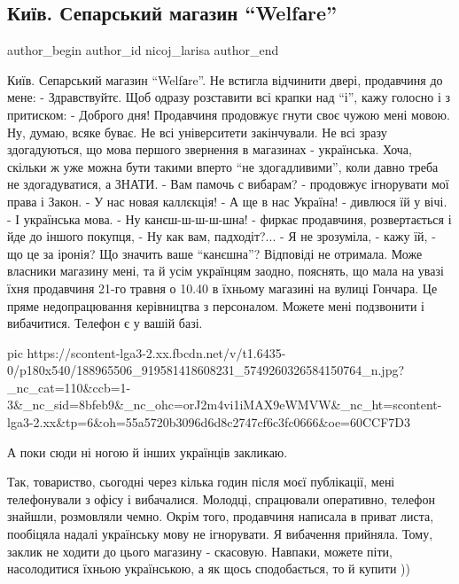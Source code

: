  
 
 
 
 
 
\subsection{Київ. Сепарський магазин \enquote{Welfаre}}
\label{sec:21_05_2021.fb.nicoj_larisa.2.kiev_magazin_welfare_mova}
\ifcmt
 author_begin
   author_id nicoj_larisa
 author_end
\fi

\obeycr
Київ. Сепарський магазин \enquote{Welfаre}.
Не встигла відчинити двері, продавчиня до мене:
- Здравствуйтє.
Щоб одразу розставити всі крапки над \enquote{і}, кажу голосно і з притиском:
- Доброго дня!
Продавчиня продовжує гнути своє чужою мені мовою. Ну, думаю, всяке буває. Не
всі університети закінчували. Не всі зразу здогадуються, що мова першого
звернення в магазинах - українська. Хоча, скільки ж уже можна бути такими
вперто \enquote{не здогадливими}, коли давно треба не здогадуватися, а ЗНАТИ.
- Вам памочь с вибарам? - продовжує ігнорувати мої права і Закон. - У нас новая каллєкція! 
- А ще в нас Україна! - дивлюся їй у вічі. - І українська мова.
- Ну канєш-ш-ш-ш-шна! - фиркає продавчиня, розвертається і йде до іншого покупця, - Ну как вам, падходіт?...
- Я не зрозуміла, - кажу їй, - що це за іронія? Що значить ваше \enquote{канєшна}? 
Відповіді не отримала. Може власники магазину мені, та й усім українцям заодно,
пояснять, що мала на увазі їхня продавчиня 21-го травня о 10.40 в їхньому
магазині на вулиці Гончара. Це пряме недопрацювання керівництва з персоналом.
Можете мені подзвонити і вибачитися. Телефон є у вашій базі. 
\restorecr

\ifcmt
  pic https://scontent-lga3-2.xx.fbcdn.net/v/t1.6435-0/p180x540/188965506_919581418608231_5749260326584150764_n.jpg?_nc_cat=110&ccb=1-3&_nc_sid=8bfeb9&_nc_ohc=orJ2m4vi1iMAX9eWMVW&_nc_ht=scontent-lga3-2.xx&tp=6&oh=55a5720b3096d6d8c2747cf6c3fc0666&oe=60CCF7D3
\fi

А поки сюди ні ногою й інших українців закликаю.

Так, товариство, сьогодні через кілька годин після моєї публікації, мені
телефонували з офісу і вибачалися. Молодці, спрацювали оперативно, телефон
знайшли, розмовляли чемно. Окрім того, продавчиня написала в приват листа,
пообіцяла надалі українську мову не ігнорувати. Я вибачення прийняла. Тому,
заклик не ходити до цього магазину - скасовую. Навпаки, можете піти,
насолодитися їхньою українською, а як щось сподобається, то й купити ))
